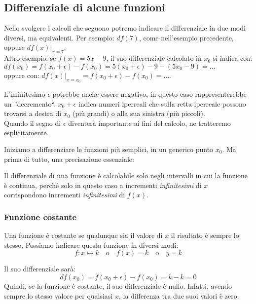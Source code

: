 \subsection{Differenziale di alcune funzioni}
\label{subsec:diff01_difffun}

Nello svolgere i calcoli che seguono potremo indicare il differenziale in due
modi diversi, ma equivalenti. Per esempio: \(df(7)\), come nell'esempio 
precedente, oppure \(df(x)|_{x=7}\).\\
Altro esempio: se \(f(x)= 5x-9\), il suo differenziale calcolato in $x_0$ si 
indica con:\\
\(df(x_0)=f(x_0+\epsilon)-f(x_0)=5(x_0+\epsilon)-9- (5x_0-9)=\dots\)\\ oppure 
con: \(df(x)|_{x=x_0}=f(x_0+\epsilon)-f(x_0)=\dots\). 

\begin{osservazione}
 L'infinitesimo $\epsilon$ potrebbe anche essere negativo, in questo caso 
rappresenterebbe un ''decremento``. 
\(x_0 + \epsilon\) indica numeri iperreali che sulla retta iperreale possono
trovarsi a destra di \(x_0\) (più grandi) o alla sua sinistra (più piccoli).\\
\noindent Quando il segno di \(\epsilon\) diventerà importante ai fini del 
calcolo, ne 
tratteremo esplicitamente.\\
\end{osservazione}

Iniziamo a differenziare le funzioni più semplici, in un generico punto 
$x_0$. Ma prima di tutto, una precisazione essenziale:

\begin{osservazione}
 Il differenziale di una funzione è calcolabile solo negli intervalli in cui
 la funzione è continua, perché solo in questo caso a incrementi 
\emph{infinitesimi} di $x$ corrispondono incrementi \emph{infinitesimi} di 
$f(x)$.
\end{osservazione}

\subsubsection{Funzione costante}
\label{subsubsec:diff01_diffcostante}

Una funzione è costante se qualunque sia il valore di $x$ il risultato è 
sempre lo stesso. Possiamo indicare questa funzione in diversi modi:
\[f: x \mapsto k \quad \text{o} \quad f(x)=k \quad \text{o} \quad y = k\]

Il suo differenziale sarà:
\[df(x_0)=f(x_0+\epsilon)-f(x_0)=k-k=0\]
Quindi, se la funzione è costante, il suo differenziale è nullo.
Infatti, avendo sempre lo stesso valore per qualsiasi \(x\), la differenza 
tra due suoi valori è zero. 


